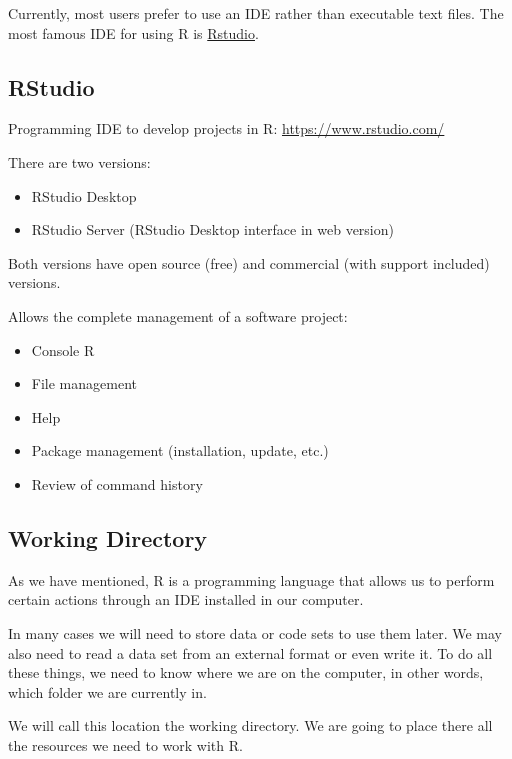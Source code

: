 \documentclass[
]{book}
\providecommand{\tightlist}{%
  \setlength{\itemsep}{0pt}\setlength{\parskip}{0pt}}
\theoremstyle{definition}
\theoremstyle{definition}
\theoremstyle{definition}
\theoremstyle{definition}
\theoremstyle{remark}
\begin{document}
Currently, most users prefer to use an IDE rather than executable text files. The most famous IDE for using R is \href{https://rstudio.com/}{Rstudio}.

\hypertarget{rstudio}{%
\subsection{RStudio}\label{rstudio}}

Programming IDE to develop projects in R: \url{https://www.rstudio.com/}

There are two versions:

\begin{itemize}
\tightlist
\item
  RStudio Desktop
\item
  RStudio Server (RStudio Desktop interface in web version)
\end{itemize}

Both versions have open source (free) and commercial (with support included) versions.

Allows the complete management of a software project:

\begin{itemize}
\tightlist
\item
  Console R
\item
  File management
\item
  Help
\item
  Package management (installation, update, etc.)
\item
  Review of command history
\end{itemize}

\hypertarget{working-directory}{%
\subsection{Working Directory}\label{working-directory}}

As we have mentioned, R is a programming language that allows us to perform certain actions through an IDE installed in our computer.

In many cases we will need to store data or code sets to use them later. We may also need to read a data set from an external format or even write it. To do all these things, we need to know where we are on the computer, in other words, which folder we are currently in.

We will call this location the working directory. We are going to place there all the resources we need to work with R.
\end{document}
